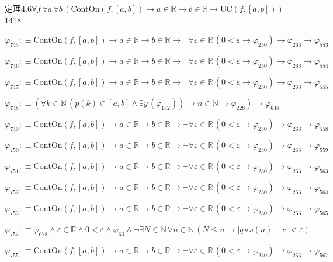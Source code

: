 \begin{fullproof}{定理4.6}{$\forall f\,\forall a\,\forall b\,(\mathrm{ContOn}(f,[a,b]) \to a \in \mathbb{R} \to b \in \mathbb{R} \to \mathrm{UC}(f,[a,b]))$}{1418}
\begin{abbrevlist}
\item $\varphi_{745} :\equiv \mathrm{ContOn}(f,[a,b]) \to a \in \mathbb{R} \to b \in \mathbb{R} \to \neg \forall \varepsilon \in \mathbb{R}\,(0 < \varepsilon \to \varphi_{230}) \to \varphi_{263} \to \varphi_{553}$
\item $\varphi_{746} :\equiv \mathrm{ContOn}(f,[a,b]) \to a \in \mathbb{R} \to b \in \mathbb{R} \to \neg \forall \varepsilon \in \mathbb{R}\,(0 < \varepsilon \to \varphi_{230}) \to \varphi_{263} \to \varphi_{554}$
\item $\varphi_{747} :\equiv \mathrm{ContOn}(f,[a,b]) \to a \in \mathbb{R} \to b \in \mathbb{R} \to \neg \forall \varepsilon \in \mathbb{R}\,(0 < \varepsilon \to \varphi_{230}) \to \varphi_{263} \to \varphi_{555}$
\item $\varphi_{748} :\equiv (\forall k \in \mathbb{N}\,(p(k) \in [a,b] \land \exists y\,(\varphi_{142})) \to n \in \mathbb{N} \to \varphi_{228}) \to \varphi_{648}$
\item $\varphi_{749} :\equiv \mathrm{ContOn}(f,[a,b]) \to a \in \mathbb{R} \to b \in \mathbb{R} \to \neg \forall \varepsilon \in \mathbb{R}\,(0 < \varepsilon \to \varphi_{230}) \to \varphi_{263} \to \varphi_{558}$
\item $\varphi_{750} :\equiv \mathrm{ContOn}(f,[a,b]) \to a \in \mathbb{R} \to b \in \mathbb{R} \to \neg \forall \varepsilon \in \mathbb{R}\,(0 < \varepsilon \to \varphi_{230}) \to \varphi_{263} \to \varphi_{559}$
\item $\varphi_{751} :\equiv \mathrm{ContOn}(f,[a,b]) \to a \in \mathbb{R} \to b \in \mathbb{R} \to \neg \forall \varepsilon \in \mathbb{R}\,(0 < \varepsilon \to \varphi_{230}) \to \varphi_{263} \to \varphi_{563}$
\item $\varphi_{752} :\equiv \mathrm{ContOn}(f,[a,b]) \to a \in \mathbb{R} \to b \in \mathbb{R} \to \neg \forall \varepsilon \in \mathbb{R}\,(0 < \varepsilon \to \varphi_{230}) \to \varphi_{263} \to \varphi_{564}$
\item $\varphi_{753} :\equiv \mathrm{ContOn}(f,[a,b]) \to a \in \mathbb{R} \to b \in \mathbb{R} \to \neg \forall \varepsilon \in \mathbb{R}\,(0 < \varepsilon \to \varphi_{230}) \to \varphi_{263} \to \varphi_{565}$
\item $\varphi_{754} :\equiv \varphi_{678} \land \varepsilon \in \mathbb{R} \land 0 < \varepsilon \land \varphi_{63} \land \neg \exists N \in \mathbb{N}\,\forall n \in \mathbb{N}\,(N \leq n \to \lvert q \circ s(n) - c \rvert < \varepsilon)$
\item $\varphi_{755} :\equiv \mathrm{ContOn}(f,[a,b]) \to a \in \mathbb{R} \to b \in \mathbb{R} \to \neg \forall \varepsilon \in \mathbb{R}\,(0 < \varepsilon \to \varphi_{230}) \to \varphi_{263} \to \varphi_{567}$

\end{abbrevlist}
\end{fullproof}
